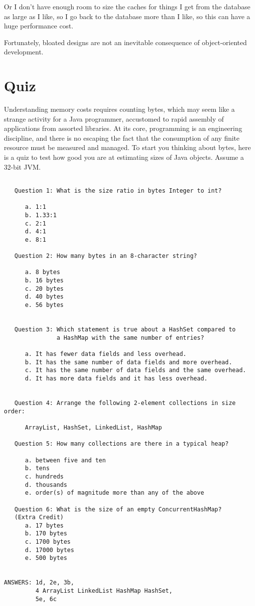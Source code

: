 Or I don't have enough room to size the caches for things I get from the database as large as I like, 
so I go back to the database more than I like, so this can have a huge performance cost.

Fortunately, bloated designs are not an inevitable consequence of object-oriented development.

\section{Quiz}

Understanding memory costs requires counting bytes, which may seem like a strange activity for a Java programmer,
 accustomed to rapid assembly of applications from assorted libraries. At its core, programming is an engineering discipline, 
 and there is no escaping the fact that the consumption of any finite resource must be measured and managed.  
 To start you thinking about bytes, here is a quiz to test how good you are at estimating sizes of Java objects. 
 Assume a 32-bit JVM.
 
\begin{verbatim}

   Question 1: What is the size ratio in bytes Integer to int?
   
      a. 1:1
      b. 1.33:1
      c. 2:1
      d. 4:1
      e. 8:1
   
   Question 2: How many bytes in an 8-character string?

      a. 8 bytes
      b. 16 bytes
      c. 20 bytes
      d. 40 bytes
      e. 56 bytes
 
   
   Question 3: Which statement is true about a HashSet compared to 
               a HashMap with the same number of entries?
               
      a. It has fewer data fields and less overhead.
      b. It has the same number of data fields and more overhead.
      c. It has the same number of data fields and the same overhead.
      d. It has more data fields and it has less overhead.
                  
                       
   Question 4: Arrange the following 2-element collections in size order:
    
      ArrayList, HashSet, LinkedList, HashMap
          
   Question 5: How many collections are there in a typical heap?
   
      a. between five and ten
      b. tens
      c. hundreds
      d. thousands
      e. order(s) of magnitude more than any of the above

   Question 6: What is the size of an empty ConcurrentHashMap?
   (Extra Credit)
      a. 17 bytes
      b. 170 bytes
      c. 1700 bytes
      d. 17000 bytes
      e. 500 bytes
           

ANSWERS: 1d, 2e, 3b, 
         4 ArrayList LinkedList HashMap HashSet, 
         5e, 6c                 
\end{verbatim}

